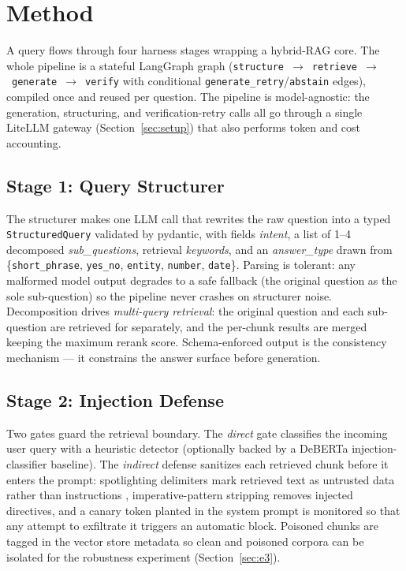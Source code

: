 \documentclass[twocolumn,10pt]{article}
\begin{document}
\section{Method}
\label{sec:method}

A query flows through four harness stages wrapping a hybrid-RAG core. The
whole pipeline is a stateful LangGraph graph
(\texttt{structure}~$\rightarrow$~\texttt{retrieve}~$\rightarrow$~\texttt{generate}~$\rightarrow$~\texttt{verify}
with conditional \texttt{generate\_retry}/\texttt{abstain} edges), compiled
once and reused per question. The pipeline is model-agnostic: the generation,
structuring, and verification-retry calls all go through a single LiteLLM
gateway (Section~\ref{sec:setup}) that also performs token and cost
accounting.

\subsection{Stage 1: Query Structurer}
\label{sec:structurer}
The structurer makes one LLM call that rewrites the raw question into a typed
\texttt{StructuredQuery} validated by pydantic, with fields \emph{intent}, a
list of 1--4 decomposed \emph{sub\_questions}, retrieval \emph{keywords}, and
an \emph{answer\_type} drawn from
\{\texttt{short\_phrase}, \texttt{yes\_no}, \texttt{entity},
\texttt{number}, \texttt{date}\}. Parsing is tolerant: any malformed model
output degrades to a safe fallback (the original question as the sole
sub-question) so the pipeline never crashes on structurer noise. Decomposition
drives \emph{multi-query retrieval}: the original question and each
sub-question are retrieved for separately, and the per-chunk results are
merged keeping the maximum rerank score. Schema-enforced output is the
consistency mechanism --- it constrains the answer surface before generation.

\subsection{Stage 2: Injection Defense}
\label{sec:defense}
Two gates guard the retrieval boundary. The \emph{direct} gate classifies the
incoming user query with a heuristic detector (optionally backed by a
DeBERTa injection-classifier baseline). The \emph{indirect} defense sanitizes
each retrieved chunk before it enters the prompt: spotlighting delimiters mark
retrieved text as untrusted data rather than instructions
\citep{hines2024spotlighting}, imperative-pattern stripping removes injected
directives, and a canary token planted in the system prompt is monitored so
that any attempt to exfiltrate it triggers an automatic block. Poisoned chunks
are tagged in the vector store metadata so clean and poisoned corpora can be
isolated for the robustness experiment (Section~\ref{sec:e3}).
\end{document}
